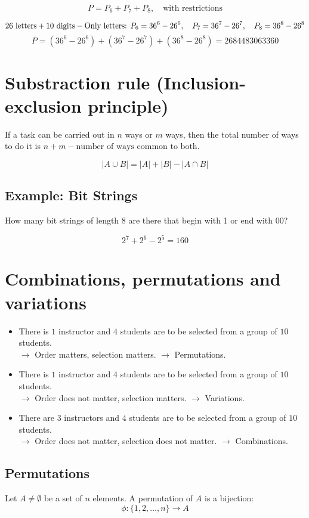 \documentclass[11pt]{article}
\begin{document}
\[
P = P_6 + P_7 + P_8, \quad \text{with restrictions}
\]

\[
26 \text{ letters} + 10 \text{ digits} -\\
\text{Only letters: } P_6 = 36^6 - 26^6, \quad P_7 = 36^7 - 26^7, \quad P_8 = 36^8 - 26^8
\]
\[
P = (36^6 - 26^6) + (36^7 - 26^7) + (36^8 - 26^8) = 2684483063360
\]

\section{Substraction rule (Inclusion-exclusion principle)}
If a task can be carried out in $n$ ways or $m$ ways, then the total number of ways to do it is $n + m - \text{number of ways common to both}$.

\[
|A \cup B| = |A| + |B| - |A \cap B|
\]

\subsection*{Example: Bit Strings}
How many bit strings of length 8 are there that begin with 1 or end with 00?

\[
2^7 + 2^6 - 2^5 = 160
\]

\section{Combinations, permutations and variations}
\begin{itemize}
    \item There is $1$ instructor and $4$ students are to be selected from a group of $10$ students. \\ 
    $\rightarrow$ Order matters, selection matters. $\rightarrow$ Permutations.
    
    \item There is $1$ instructor and $4$ students are to be selected from a group of $10$ students. \\ 
    $\rightarrow$ Order does not matter, selection matters. $\rightarrow$ Variations.
    
    \item There are $3$ instructors and $4$ students are to be selected from a group of $10$ students. \\ 
    $\rightarrow$ Order does not matter, selection does not matter. $\rightarrow$ Combinations.
\end{itemize}

\subsection{Permutations}
Let $A \neq \emptyset$ be a set of $n$ elements. A permutation of $A$ is a bijection:
\[
\phi: \{1,2,\dots ,n\} \rightarrow A
\]
\end{document}

